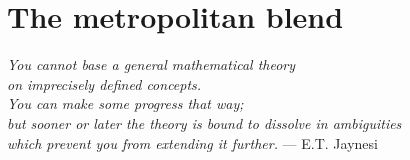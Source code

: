 %
\chapter{The metropolitan blend}
\label{chap:metropolitan_blend}

\begin{flushright}{\slshape
You cannot base a general mathematical theory\\
on imprecisely defined concepts.\\
You can make some progress that way; \\
but sooner or later the theory is bound to dissolve in ambiguities\\ 
which prevent you from extending it further.} \medskip
--- E.T. Jaynesi~\cite{Jaynes:1986}
\end{flushright}
